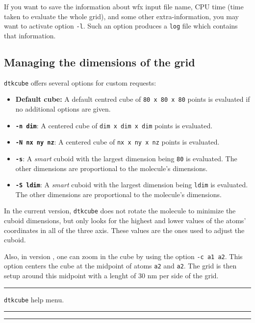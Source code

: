 If you want to save the information about wfx input file name, CPU time (time taken to evaluate the whole grid), and some other extra-information, you may want to activate option \texttt{-l}.
Such an option produces a \texttt{log} file which contains that information.

\subsection{Managing the dimensions of the grid}

\texttt{dtkcube} offers several options for custom requests:
\begin{itemize}
   \item \textbf{Default cube: } A default centred cube of \texttt{80 x 80 x 80} points is evaluated if no additional options are given.
  	\item\texttt{\textbf{-n dim}}: A centered cube of \texttt{dim x dim x dim} points is evaluated.
	\item\texttt{\textbf{-N nx ny nz}}: A centered cube of \texttt{nx x ny x nz} points is evaluated.
	\item\texttt{\textbf{-s}}: A \textit{smart} cuboid with the largest dimension being \texttt{80} is evaluated. The other dimensions are proportional to the molecule's dimensions.
	\item\texttt{\textbf{-S ldim}}: A \textit{smart} cuboid with the largest dimension being \texttt{ldim} is evaluated. The other dimensions are proportional to the molecule's dimensions.
\end{itemize}

In the current version, \texttt{dtkcube} does not rotate the molecule to minimize the cuboid dimensions, but only looks for the highest and lower values of the atoms' coordinates in all of the three axis. These values are the ones used to adjust the cuboid.

Also, in version \dtkversion, one can zoom in the cube by using the option \texttt{-c a1 a2}.
This option centers the cube at the midpoint of atoms \texttt{a2} and \texttt{a2}.
The grid is then setup around this midpoint with a lenght of 30 nm per side of the grid.

\rule{\textwidth}{1pt}
{\center\texttt{dtkcube} help menu.\\}
\rule{\textwidth}{1pt}
\begin{footnotesize}
\end{footnotesize}
\rule{\textwidth}{1pt}
